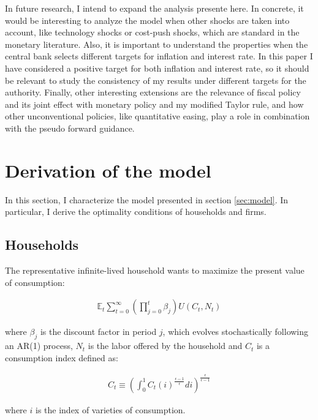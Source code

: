 \documentclass[12pt]{article}
\numberwithin{equation}{section}
\begin{document}
In future research, I intend to expand the analysis presente here. In concrete, it would be interesting to analyze the model when other shocks are taken into account, like technology shocks or cost-push shocks, which are standard in the monetary literature. Also, it is important to understand the properties when the central bank selects different targets for inflation and interest rate. In this paper I have considered a positive target for both inflation and interest rate, so it should be relevant to study the consistency of my results under different targets for the authority. Finally, other interesting extensions are the relevance of fiscal policy and its joint effect with monetary policy and my modified Taylor rule, and how other unconventional policies, like quantitative easing, play a role in combination with the pseudo forward guidance.




\newpage\appendix

\section{Derivation of the model}\label{app:derivation}

In this section, I characterize the model presented in section \ref{sec:model}. In particular, I derive the optimality conditions of households and firms.

\subsection{Households}

The representative infinite-lived household wants to maximize the present value of consumption:

\begin{align*}
\mathbb{E}_t\sum_{t=0}^{\infty}\left(\prod_{j=0}^t\beta_j\right)U(C_t,N_t)
\end{align*}

where $\beta_j$ is the discount factor in period $j$, which evolves stochastically following an AR(1) process, $N_t$ is the labor offered by the household and $C_t$ is a consumption index defined as:

\begin{align*}
C_t\equiv\left(\int_0^1C_t(i)^{\frac{\epsilon-1}{\epsilon}}di\right)^{\frac{\epsilon}{\epsilon-1}}
\end{align*}

where $i$ is the index of varieties of consumption. 
\end{document}
